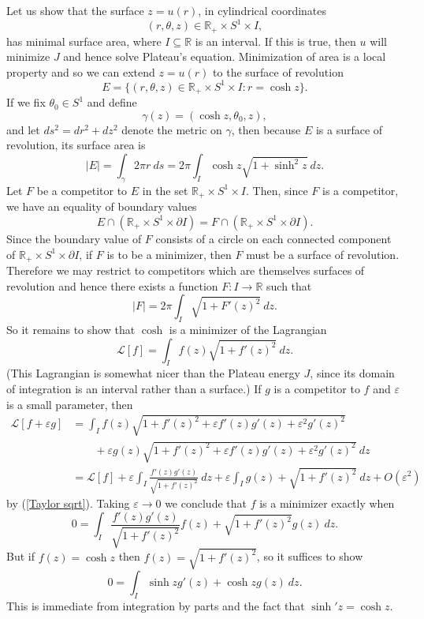 \documentclass[10pt]{article}
\newcommand{\RR}{\mathbb{R}}
\theoremstyle{definition}
\begin{document}
Let us show that the surface $z = u(r)$, in cylindrical coordinates
$$(r, \theta, z) \in \RR_+ \times S^1 \times I,$$
has minimal surface area, where $I \subseteq \RR$ is an interval. If this is true, then $u$ will minimize $J$ and hence solve Plateau's equation.
Minimization of area is a local property and so we can extend $z = u(r)$ to the surface of revolution
$$E = \{(r, \theta, z) \in \RR_+ \times S^1 \times I: r = \cosh z\}.$$
If we fix $\theta_0 \in S^1$ and define
$$\gamma(z) = (\cosh z, \theta_0, z),$$
and let $ds^2 = dr^2 + dz^2$ denote the metric on $\gamma$, then because $E$ is a surface of revolution, its surface area is
$$|E| = \int_\gamma 2\pi r ~ds = 2\pi \int_I \cosh z \sqrt{1 + \sinh^2 z} ~dz.$$
Let $F$ be a competitor to $E$ in the set $\RR_+ \times S^1 \times I$. Then, since $F$ is a competitor, we have an equality of boundary values
$$E \cap (\RR_+ \times S^1 \times \partial I)  = F \cap (\RR_+ \times S^1 \times \partial I).$$
Since the boundary value of $F$ consists of a circle on each connected component of $\RR_+ \times S^1 \times \partial I$, if $F$ is to be a minimizer, then $F$ must be a surface of revolution.
Therefore we may restrict to competitors which are themselves surfaces of revolution and hence there exists a function $F: I \to \RR$ such that 
$$|F| = 2\pi \int_I \sqrt{1 + F'(z)^2} ~dz.$$
So it remains to show that $\cosh$ is a minimizer of the Lagrangian 
$$\mathscr L[f] = \int_I f(z) \sqrt{1 + f'(z)^2} ~dz.$$
(This Lagrangian is somewhat nicer than the Plateau energy $J$, since its domain of integration is an interval rather than a surface.)
If $g$ is a competitor to $f$ and $\varepsilon$ is a small parameter, then 
\begin{align*}
    \mathscr L[f + \varepsilon g] &= \int_I f(z) \sqrt{1 + f'(z)^2 + \varepsilon f'(z) g'(z) + \varepsilon^2 g'(z)^2} \\
    &\qquad + \varepsilon g(z) \sqrt{1 + f'(z)^2 + \varepsilon f'(z) g'(z) + \varepsilon^2 g'(z)^2} ~dz \\
    &= \mathscr L[f] + \varepsilon \int_I \frac{f'(z) g'(z)}{\sqrt{1 + f'(z)^2}} ~dz + \varepsilon \int_I g(z) + \sqrt{1 + f'(z)^2} ~dz + O(\varepsilon^2)
\end{align*}
by (\ref{Taylor sqrt}). Taking $\varepsilon \to 0$ we conclude that $f$ is a minimizer exactly when 
$$0 = \int_I \frac{f'(z) g'(z)}{\sqrt{1 + f'(z)^2}} f(z) + \sqrt{1 + f'(z)^2} g(z) ~dz.$$
But if $f(z) = \cosh z$ then $f(z) = \sqrt{1 + f'(z)^2}$, so it suffices to show 
$$0 = \int_I \sinh z g'(z) + \cosh z g(z) ~dz.$$
This is immediate from integration by parts and the fact that $\sinh' z = \cosh z$.
\end{document}
